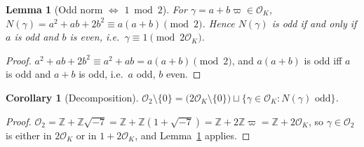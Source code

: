 \documentclass[11pt]{article}
\newtheorem{lemma}[theorem]{Lemma}
\newtheorem{corollary}[theorem]{Corollary}
\theoremstyle{definition}
\theoremstyle{remark}
\newcommand{\Zz}{\mathbb{Z}}
\newcommand{\OO}{\mathcal{O}}
\begin{document}
\begin{lemma}[Odd norm $\Leftrightarrow$ $1\bmod2$]\label{lem:oddnorm}
For $\gamma=a+b\varpi\in\OO_K$,
$N(\gamma)=a^2+ab+2b^2\equiv a(a+b)\pmod2$. Hence $N(\gamma)$ is odd if
and only if $a$ is odd and $b$ is even, i.e.\ $\gamma\equiv1\pmod{2\OO_K}$.
\end{lemma}
\begin{proof}
$a^2+ab+2b^2\equiv a^2+ab=a(a+b)\pmod2$, and $a(a+b)$ is odd iff $a$ is
odd and $a+b$ is odd, i.e.\ $a$ odd, $b$ even.
\end{proof}

\begin{corollary}[Decomposition]\label{cor:decomp}
$\OO_2\setminus\{0\}=\bigl(2\OO_K\setminus\{0\}\bigr)\sqcup
\{\gamma\in\OO_K:N(\gamma)\text{ odd}\}$.
\end{corollary}
\begin{proof}
$\OO_2=\Zz+\Zz\sqrt{-7}=\Zz+\Zz(1+\sqrt{-7})=\Zz+2\Zz\varpi=\Zz+2\OO_K$,
so $\gamma\in\OO_2$ is either in $2\OO_K$ or in $1+2\OO_K$, and
Lemma~\ref{lem:oddnorm} applies.
\end{proof}
\end{document}
